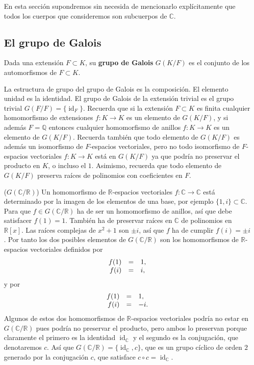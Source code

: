 
En esta sección supondremos sin necesida de mencionarlo explícitamente
que todos los cuerpos que consideremos son subcuerpos de \(\mathbb C\).

\hypertarget{el-grupo-de-galois}{%
\subsection{El grupo de Galois}\label{el-grupo-de-galois}}


Dada una extensión \(F\subset K\), su \textbf{grupo de Galois}
\(G(K/F)\) es el conjunto de los automorfismos de \(F\subset K\).


La estructura de grupo del grupo de Galois es la composición. El
elemento unidad es la identidad. El grupo de Galois de la extensión
trivial es el grupo trivial \(G(F/F)=\{\operatorname{id}_{F}\}\).
Recuerda que si la extensión \(F\subset K\) es finita cualquier
homomorfismo de extensiones \(f\colon K\rightarrow K\) es un elemento de
\(G(K/F)\), y si además \(F=\mathbb Q\) entonces cualquier homomorfismo
de anillos \(f\colon K\rightarrow K\) es un elemento de \(G(K/F)\).
Recuerda también que todo elemento de \(G(K/F)\) es además un
isomorfismo de \(F\)-espacios vectoriales, pero no todo isomorfismo de
\(F\)-espacios vectoriales \(f\colon K\rightarrow K\) está en \(G(K/F)\)
ya que podría no preservar el producto en \(K\), o incluso el \(1\).
Asimismo, recuerda que todo elemento de \(G(K/F)\) preserva raíces de
polinomios con coeficientes en \(F\). 

\textrm{\normalfont ($G(\mathbb C/\mathbb R)$)} Un
homomorfismo de \(\mathbb R\)-espacios vectoriales
\(f\colon \mathbb C\rightarrow\mathbb C\) está determinado por la imagen
de los elementos de una base, por ejemplo \(\{1,i\}\subset\mathbb C\).
Para que \(f\in G(\mathbb C/\mathbb R)\) ha de ser un homomorfismo de
anillos, así que debe satisfacer \(f(1)=1\). También ha de preservar
raíces en \(\mathbb C\) de polinomios en \(\mathbb R[x]\). Las raíces
complejas de \(x^2+1\) son \(\pm i\), así que \(f\) ha de cumplir
\(f(i)=\pm i\). Por tanto los dos posibles elementos de
\(G(\mathbb C/\mathbb R)\) son los homomorfismos de
\(\mathbb R\)-espacios vectoriales definidos por
\[\begin{array}{rcl}f(1)&=&1,\cr f(i)&=&i,\end{array}\] y por
\[\begin{array}{rcl}f(1)&=&1,\cr f(i)&=&-i.\end{array}\] Algunos de
estos dos homomorfismos de \(\mathbb R\)-espacios vectoriales podría no
estar en \(G(\mathbb C/\mathbb R)\) pues podría no preservar el
producto, pero ambos lo preservan porque claramente el primero es la
identidad \(\operatorname{id}_{\mathbb C}\) y el segundo es la
conjugación, que denotaremos \(c\). Así que
\(G(\mathbb C/\mathbb R)=\{\operatorname{id}_{\mathbb C},c\}\), que
es un grupo cíclico de orden \(2\) generado por la conjugación \(c\),
que satisface \(c\circ c=\operatorname{id}_{\mathbb C}\). 

